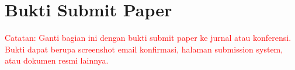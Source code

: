 \section{Bukti Submit Paper}

% 

\textcolor{red}{Catatan: Ganti bagian ini dengan bukti submit paper ke jurnal atau konferensi. Bukti dapat berupa screenshot email konfirmasi, halaman submission system, atau dokumen resmi lainnya.}
